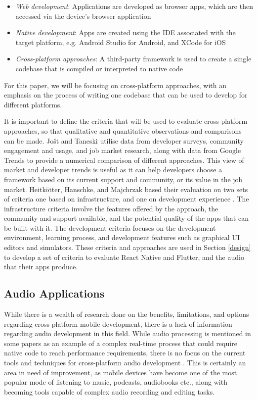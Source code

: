 \begin{itemize}
    \item \textit{Web development}: Applications are developed as browser apps, which are then accessed via the device's browser application
    \item \textit{Native development}: Apps are created using the IDE associated with the target platform, e.g. Android Studio for Android, and XCode for iOS
    \item \textit{Cross-platform approaches}: A third-party framework is used to create a single codebase that is compiled or interpreted to native code
\end{itemize}

For this paper, we will be focusing on cross-platform approaches, with an emphasis on the process of writing one codebase that can be used to develop for different platforms.

It is important to define the criteria that will be used to evaluate cross-platform approaches, so that qualitative and quantitative observations and comparisons can be made. Jošt and Taneski \cite{Jost2025} utilise data from developer surveys, community engagement and usage, and job market research, along with data from Google Trends to provide a numerical comparison of different approaches. This view of market and developer trends is useful as it can help developers choose a framework based on its current support and community, or its value in the job market.  Heitkötter, Hanschke, and Majchrzak based their evaluation on two sets of criteria one based on infrastructure, and one on development experience \cite{Heitkotter2012}. The infrastructure criteria involve the features offered by the approach, the community and support available, and the potential quality of the apps that can be built with it. The development criteria focuses on the development environment, learning process, and development features such as graphical UI editors and simulators. These criteria and approaches are used in Section \ref{design} to develop a set of criteria to evaluate React Native and Flutter, and the audio that their apps produce.

\subsection{Audio Applications}

While there is a wealth of research done on the benefits, limitations, and options regarding cross-platform mobile development, there is a lack of information regarding audio development in this field. While audio processing is mentioned in some papers as an example of a complex real-time process that could require native code to reach performance requirements, there is no focus on the current tools and techniques for cross-platform audio development \cite{Patil2025}. This is certainly an area in need of improvement, as mobile devices have become one of the most popular mode of listening to music, podcasts, audiobooks etc., along with becoming tools capable of complex audio recording and editing tasks.

